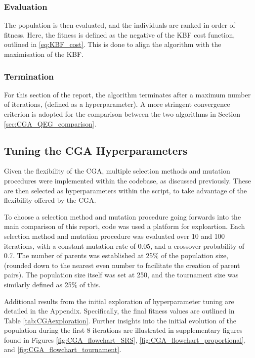 \documentclass[10pt]{article}
\begin{document}
\begin{multicols}{2}
\subsubsection{Evaluation}

The population is then evaluated, and the individuals are ranked in order of fitness. Here, the fitness is defined as the negative of the KBF cost function, outlined in \ref{eq:KBF_cost}. This is done to align the algorithm with the maximisation of the KBF.

\subsubsection{Termination}

For this section of the report, the algorithm terminates after a maximum number of iterations, (defined as a hyperparameter). A more stringent convergence criterion is adopted for the comparison between the two algorithms in Section \ref{sec:CGA_QEG_comparison}.

\subsection{Tuning the CGA Hyperparameters}
\label{sec:CGA_selection_mutation}

Given the flexibility of the CGA, multiple selection methods and mutation procedures were implemented within the codebase, as discussed previously. These are then selected as hyperparameters within the script, %
to take advantage of the flexibility offered by the CGA. 

To choose a selection method and mutation procedure going forwards into the main comparison of this report, code %
was used a platform for exploartion. Each selection method and mutation procedure was evaluated over 10 and 100 iterations, with a constant mutation rate of 0.05, and a crossover probability of 0.7. The number of parents was established at 25\% of the population size, (rounded down to the nearest even number to facilitate the creation of parent pairs). The population size itself was set at 250, and the tournament size was similarly defined as 25\% of this.

Additional results from the initial exploration of hyperparameter tuning are detailed in the Appendix. Specifically, the final fitness values are outlined in Table \ref{tab:CGAexploration}. Further insights into the initial evolution of the population during the first 8 iterations are illustrated in supplementary figures found in Figures \ref{fig:CGA_flowchart_SRS}, \ref{fig:CGA_flowchart_proportional}, and \ref{fig:CGA_flowchart_tournament}.


\end{multicols}
\end{document}
